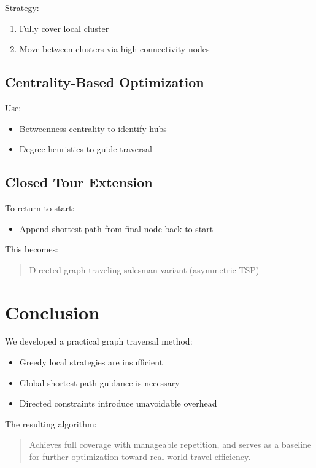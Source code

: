 \documentclass[11pt]{article}
\begin{document}
Strategy:

\begin{enumerate}
    \item Fully cover local cluster
    \item Move between clusters via high-connectivity nodes
\end{enumerate}

\subsection*{Centrality-Based Optimization}

Use:

\begin{itemize}
    \item Betweenness centrality to identify hubs
    \item Degree heuristics to guide traversal
\end{itemize}

\subsection*{Closed Tour Extension}

To return to start:

\begin{itemize}
    \item Append shortest path from final node back to start
\end{itemize}

This becomes:

\begin{quote}
Directed graph traveling salesman variant (asymmetric TSP)
\end{quote}

\section{Conclusion}

We developed a practical graph traversal method:

\begin{itemize}
    \item Greedy local strategies are insufficient
    \item Global shortest-path guidance is necessary
    \item Directed constraints introduce unavoidable overhead
\end{itemize}

The resulting algorithm:

\begin{quote}
Achieves full coverage with manageable repetition, and serves as a baseline for further optimization toward real-world travel efficiency.
\end{quote}
\end{document}
